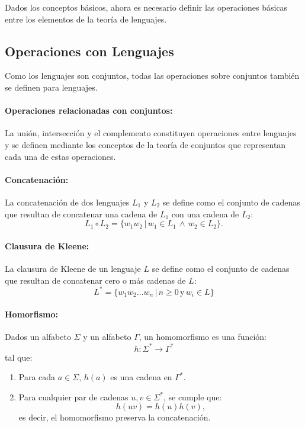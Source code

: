 \documentclass[12pt]{article}
\begin{document}
Dados los conceptos básicos, ahora es necesario definir las operaciones básicas entre los elementos de la teoría de lenguajes.

\subsection{Operaciones con Lenguajes}

Como los lenguajes son conjuntos, todas las operaciones sobre conjuntos también se definen para lenguajes.

\paragraph{Operaciones relacionadas con conjuntos:} La unión, intersección y el complemento 
constituyen operaciones entre lenguajes y se definen mediante los conceptos de la teoría de conjuntos
que representan cada una de estas operaciones.

\paragraph{Concatenación:} La concatenación de dos lenguajes $L_1$ y $L_2$ se define como el conjunto
de cadenas que resultan de concatenar una cadena de $L_1$ con una cadena de $L_2$:
$$L_1\circ L_2=\{w_1w_2\,|\,w_1\in L_1\,\wedge\,w_2\in L_2\}.$$

\paragraph{Clausura de Kleene:} La clausura de Kleene de un lenguaje $L$ se define como el conjunto de
cadenas que resultan de concatenar cero o más cadenas de $L$:
$$L^*=\{w_1w_2\ldots w_n\,|\,n\geq 0\,\text{y}\,w_i\in L\}$$

\paragraph{Homorfismo:} Dados un alfabeto \( \Sigma \) y un alfabeto \( \Gamma \), un homomorfismo es una función:
\[
      h: \Sigma^* \to \Gamma^*
\]
tal que:
\begin{enumerate}
      \item Para cada \( a \in \Sigma \), \( h(a) \) es una cadena en \( \Gamma^* \).
      \item Para cualquier par de cadenas \( u, v \in \Sigma^* \), se cumple que:
            \[
                  h(uv) = h(u) h(v),
            \]
            es decir, el homomorfismo preserva la concatenación.
\end{enumerate}
\end{document}

